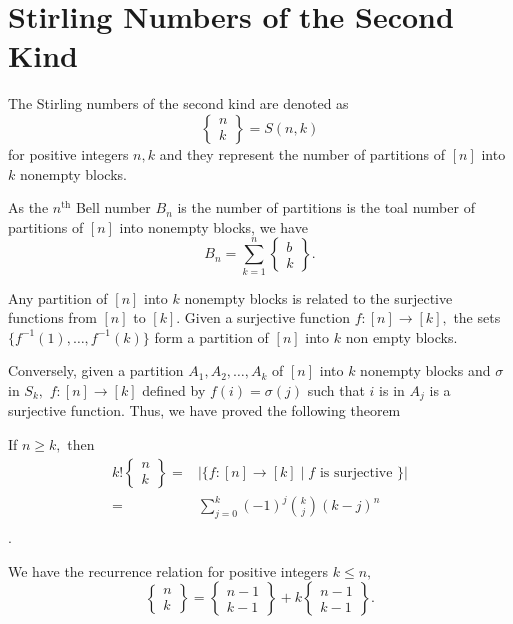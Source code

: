 \section{Stirling Numbers of the Second Kind}

\begin{definition}
	The Stirling numbers of the second kind are denoted as 
	$$ \begin{Bmatrix} n\\k \end{Bmatrix} = S(n,k)$$
	for positive integers $n,k$ and they represent the
	number of partitions of $[n]$ into $k$ nonempty blocks.
\end{definition}


\begin{remark}
	As the $n^\text{th}$ Bell number $B_n$ is the number of partitions is the toal number of partitions of $[n]$ into nonempty blocks, we have
	$$B_n = \sum_{k=1}^{n} \begin{Bmatrix} b\\k\end{Bmatrix}.$$ 
\end{remark}



Any partition of $[n]$ into $k$ nonempty blocks is related to the
surjective functions from $[n]$ to $[k].$ Given a surjective function
$f \colon [n] \to [k],$ the sets $\{ f^{-1}(1), \dotsc, f^{-1}(k)\}$
form a partition of $[n]$ into $k$ non empty blocks.

Conversely, given a partition $A_1, A_2, \dotsc, A_k$ of $[n]$ into $k$ nonempty blocks and $\sigma$ in $S_k,$ $f \colon [n] \to [k]$ defined by
$f(i) = \sigma(j)$ such that $i$ is in $A_{j}$ is a surjective function.
Thus, we have proved the following theorem
\begin{theorem}
	If $n \geq k,$ then 
	\begin{align*}
		k! \begin{Bmatrix} n\\k\end{Bmatrix}
		={}& \lvert \{ f\colon [n] \to [k] \; | \;
		f \text{ is surjective } \} \rvert \\
		={}& \sum_{j=0}^{k} (-1)^j \binom{k}{j} (k-j)^n\\
	\end{align*}.
\end{theorem}


\begin{remark}
	We have the recurrence relation for positive integers $k \leq n,$
	$$ \begin{Bmatrix} n\\k\end{Bmatrix} = 
	\begin{Bmatrix}n-1\\k-1 \end{Bmatrix} + 
	k \begin{Bmatrix}n-1\\k-1 \end{Bmatrix}. $$
\end{remark}



